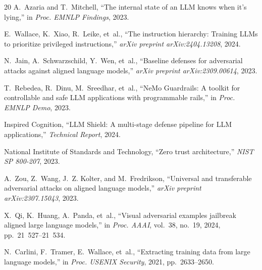 \documentclass[conference]{IEEEtran}
\begin{document}
\begin{thebibliography}{20}
A.~Azaria and T.~Mitchell, ``The internal state of an LLM knows when it's lying,'' in \emph{Proc. EMNLP Findings}, 2023.

E.~Wallace, K.~Xiao, R.~Leike, et~al., ``The instruction hierarchy: Training LLMs to prioritize privileged instructions,'' \emph{arXiv preprint arXiv:2404.13208}, 2024.

N.~Jain, A.~Schwarzschild, Y.~Wen, et~al., ``Baseline defenses for adversarial attacks against aligned language models,'' \emph{arXiv preprint arXiv:2309.00614}, 2023.

T.~Rebedea, R.~Dinu, M.~Sreedhar, et~al., ``NeMo Guardrails: A toolkit for controllable and safe LLM applications with programmable rails,'' in \emph{Proc. EMNLP Demo}, 2023.

Inspired Cognition, ``LLM Shield: A multi-stage defense pipeline for LLM applications,'' \emph{Technical Report}, 2024.

National Institute of Standards and Technology, ``Zero trust architecture,'' \emph{NIST SP 800-207}, 2023.

A.~Zou, Z.~Wang, J.~Z. Kolter, and M.~Fredrikson, ``Universal and transferable adversarial attacks on aligned language models,'' \emph{arXiv preprint arXiv:2307.15043}, 2023.

X.~Qi, K.~Huang, A.~Panda, et~al., ``Visual adversarial examples jailbreak aligned large language models,'' in \emph{Proc. AAAI}, vol.~38, no.~19, 2024, pp.~21~527--21~534.

N.~Carlini, F.~Tramer, E.~Wallace, et~al., ``Extracting training data from large language models,'' in \emph{Proc. USENIX Security}, 2021, pp.~2633--2650.

\end{thebibliography}
\end{document}
